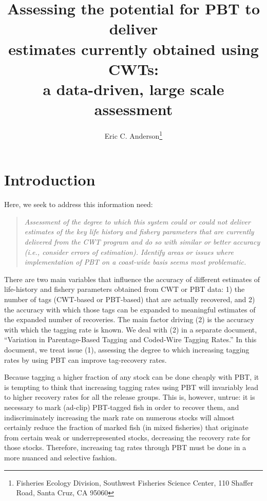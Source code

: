 \documentclass[11pt]{article}
\title{Assessing the potential for PBT to deliver \\
estimates currently obtained using CWTs: \\
a data-driven, large scale assessment}
\author{Eric C. Anderson\thanks{
    Fisheries Ecology Division, 
    Southwest Fisheries Science Center, 
    110 Shaffer Road,
    Santa Cruz, CA 95060}
}
\begin{document}
\maketitle

\tableofcontents

\section{Introduction}
Here, we seek to address this information need:
\begin{quote}
{\sl Assessment of the degree to which this system could or could not deliver estimates of the key life history and fishery parameters that are currently delivered from the CWT program and do so with similar or better accuracy (i.e., consider errors of estimation). Identify areas or issues where implementation of PBT on a coast-wide basis seems most problematic. }
\end{quote}

There are two main variables that influence the accuracy of different estimates of life-history and 
fishery parameters obtained from CWT or PBT data: 1) the number of tags (CWT-based or PBT-based) that 
are actually recovered, and 2) the accuracy with which those tags can be expanded to meaningful estimates
of the expanded number of recoveries.  The main factor driving (2) is the accuracy with
which the tagging rate is known.  We deal with (2) in a separate document, ``Variation in
Parentage-Based Tagging and Coded-Wire  Tagging  Rates.''  In this document, we treat issue (1), assessing
the degree to which increasing tagging rates by using  PBT can improve
tag-recovery rates.  

Because tagging a higher fraction of any stock can be done cheaply with PBT, it is tempting to
think that increasing tagging rates using PBT will invariably lead to higher recovery rates
for all the release groups.  This is, however, untrue: it is necessary to mark (ad-clip) PBT-tagged
fish in order to recover them, and indiscriminately increasing the mark rate on numerous stocks
will almost certainly reduce the fraction of marked fish (in mixed fisheries) that originate from
certain weak or underrepresented stocks, decreasing the recovery rate for those stocks.  Therefore, 
increasing tag rates through PBT must be done in a more nuanced and selective fashion.  
\end{document}
